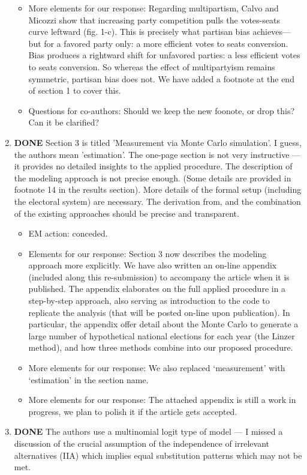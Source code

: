 \documentclass{article}
\begin{document}
\begin{enumerate}
\begin{itemize}
\item More elements for our response: Regarding multipartism, Calvo and Micozzi show that increasing party competition pulls the votes-seats curve leftward (fig. 1-c). This is precisely what partisan bias achieves---but for a favored party only: a more efficient votes to seats conversion. Bias produces a rightward shift for unfavored parties: a less efficient votes to seats conversion. So whereas the effect of multipartyism remains symmetric, partisan bias does not. We have added a footnote at the end of section 1 to cover this.
\item Questions for co-authors: Should we keep the new foonote, or drop this? Can it be clarified?
\end{itemize}
\item {\bfseries\sffamily DONE} Section 3 is titled 'Measurement via Monte Carlo simulation'. I guess, the authors mean 'estimation'. The one-page section is not very instructive --- it provides no detailed insights to the applied procedure. The description of the modeling approach is not precise enough. (Some details are provided in footnote 14 in the results section).  More details of the formal setup (including the electoral system) are necessary. The derivation from, and the combination of the existing approaches should be precise and transparent.
\label{sec:orgheadline25}
\begin{itemize}
\item EM action: conceded.
\item Elements for our response: Section 3 now describes the modeling approach more explicitly. We have also written an on-line appendix (included along this re-submission) to accompany the article when it is  published. The appendix elaborates on the full applied procedure in a step-by-step approach, also serving as introduction to the code to replicate the analysis (that will be posted on-line upon publication). In particular, the appendix offer detail about the Monte Carlo to generate a large number of hypothetical national elections for each year (the Linzer method), and how three methods combine into our proposed procedure.
\item More elements for our response: We also replaced `measurement' with `estimation' in the section name.
\item More elements for our response: The attached appendix is still a work in progress, we plan to polish it if the article gets accepted.
\end{itemize}
\item {\bfseries\sffamily DONE} The authors use a multinomial logit type of model --- I missed a discussion of the crucial assumption of the independence of irrelevant alternatives (IIA) which implies equal substitution patterns which may not be met.

\end{enumerate}
\end{document}
